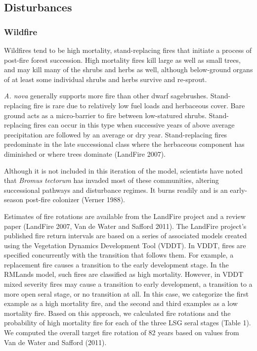 \subsection*{Disturbances}

\subsubsection{Wildfire}
Wildfires tend to be high mortality, stand-replacing fires that initiate a process of post-fire forest succession. High mortality fires kill large as well as small trees, and may kill many of the shrubs and herbs as well, although below-ground organs of at least some individual shrubs and herbs survive and re-sprout. 

\emph{A. nova} generally supports more fire than other dwarf sagebrushes. Stand-replacing fire is rare due to relatively low fuel loads and herbaceous cover. Bare ground acts as a micro-barrier to fire between low-statured shrubs. Stand-replacing fires can occur in this type when successive years of above average precipitation are followed by an average or dry year. Stand-replacing fires predominate in the late successional class where the herbaceous component has diminished or where trees dominate (LandFire 2007).

Although it is not included in this iteration of the model, scientists have noted that \emph{Bromus tectorum} has invaded most of these communities, altering successional pathways and disturbance regimes. It burns readily and is an early-season post-fire colonizer (Verner 1988).

Estimates of fire rotations are available from the LandFire project and a review paper (LandFire 2007, Van de Water and Safford 2011). The LandFire project’s published fire return intervals are based on a series of associated models created using the Vegetation Dynamics Development Tool (VDDT). In VDDT, fires are specified concurrently with the transition that follows them. For example, a replacement fire causes a transition to the early development stage. In the RMLands model, such fires are classified as high mortality. However, in VDDT mixed severity fires may cause a transition to early development, a transition to a more open seral stage, or no transition at all. In this case, we categorize the first example as a high mortality fire, and the second and third examples as a low mortality fire. Based on this approach, we calculated fire rotations and the probability of high mortality fire for each of the three LSG seral stages (Table 1). We computed the overall target fire rotation of 82 years based on values from Van de Water and Safford (2011). 




